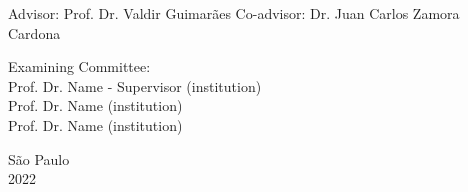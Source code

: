 \documentclass[a4paper,12pt,oneside]{book}
\begin{document}
\leftskip 6cm
\begin{flushright}	
\leftskip 6cm
Advisor: Prof. Dr.  Valdir Guimarães\hfill{ \hskip 5cm  } 
\leftskip 6cm
\newline
Co-advisor: Dr. Juan Carlos Zamora Cardona\hfill{ \hskip 4cm  }
\end{flushright}	

\vspace{0.6cm}    


\par
\leftskip 6cm
\par
\leftskip 0cm
\vskip 2cm


\noindent Examining Committee: \\
\noindent Prof. Dr. Name - Supervisor (institution) \\
Prof. Dr. Name (institution) \\
Prof. Dr. Name (institution) \\
\vspace{1.8cm}


\begin{center}
    {S\~ao Paulo \\  2022}
\end{center}%

\clearpage
\end{document}

